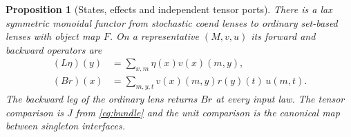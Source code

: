 \documentclass[11pt,a4paper]{article}
\newtheorem{proposition}[theorem]{Proposition}
\theoremstyle{definition}
\begin{document}
\begin{proposition}[States, effects and independent tensor ports]\label{prop:optic}
    There is a lax symmetric monoidal functor from stochastic coend lenses to ordinary set-based lenses with object map $F$. On a representative $(M,v,u)$ its forward and backward operators are
    \begin{align}
        (L\eta)(y)&=\sum_{x,m}\eta(x)v(x)(m,y),\nonumber\\
        (Br)(x)&=\sum_{m,y,t}v(x)(m,y)r(y)(t)\,u(m,t).
        \label{eq:optic}
    \end{align}
    The backward leg of the ordinary lens returns $Br$ at every input law. The tensor comparison is $J$ from \eqref{eq:bundle} and the unit comparison is the canonical map between singleton interfaces.
\end{proposition}
\end{document}
